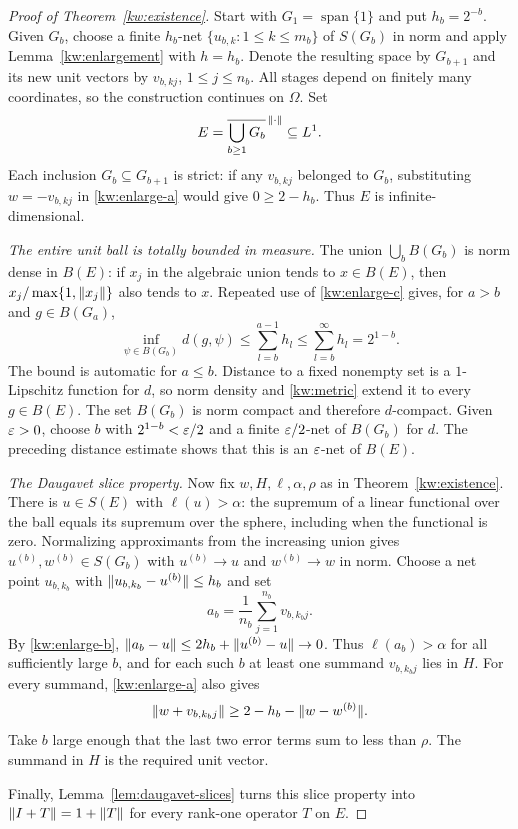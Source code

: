 \begin{proof}[Proof of Theorem~\ref{kw:existence}]
Start with $G_1=\operatorname{span}\{1\}$ and put $h_b=2^{-b}$.
Given $G_b$, choose a finite $h_b$-net
$\{u_{b,k}:1\le k\le m_b\}$ of $S(G_b)$ in norm and apply
Lemma~\ref{kw:enlargement} with $h=h_b$.  Denote the resulting space by
$G_{b+1}$ and its new unit vectors by $v_{b,kj}$, $1\le j\le n_b$.
All stages depend on finitely many coordinates, so the construction
continues on $\Omega$.  Set
\[
 E=\overline{\bigcup_{b\ge1}G_b}^{\,\lVert\cdot\rVert}\subseteq L^1.
\]
Each inclusion $G_b\subseteq G_{b+1}$ is strict: if any $v_{b,kj}$
belonged to $G_b$, substituting $w=-v_{b,kj}$ in
\eqref{kw:enlarge-a} would give $0\ge2-h_b$.
Thus $E$ is infinite-dimensional.

\emph{The entire unit ball is totally bounded in measure.}
The union
$\bigcup_bB(G_b)$ is norm dense in $B(E)$: if $x_j$ in the algebraic
union tends to $x\in B(E)$, then
$x_j/\max\{1,\lVert x_j\rVert\}$ also tends to $x$.
Repeated use of \eqref{kw:enlarge-c} gives, for $a>b$ and $g\in B(G_a)$,
\[
 \inf_{\psi\in B(G_b)}d(g,\psi)
 \le\sum_{l=b}^{a-1}h_l
 \le\sum_{l=b}^\infty h_l=2^{1-b}.
\]
The bound is automatic for $a\le b$.  Distance to a fixed nonempty
set is a $1$-Lipschitz function for $d$, so norm density and
\eqref{kw:metric} extend it to every $g\in B(E)$.
The set $B(G_b)$ is norm compact and therefore $d$-compact.
Given $\varepsilon>0$, choose $b$ with $2^{1-b}<\varepsilon/2$ and a finite
$\varepsilon/2$-net of $B(G_b)$ for $d$.  The preceding distance estimate
shows that this is an $\varepsilon$-net of $B(E)$.

\emph{The Daugavet slice property.}
Now fix $w,H,\ell,\alpha,\rho$ as in Theorem~\ref{kw:existence}.
There is $u\in S(E)$ with $\ell(u)>\alpha$: the supremum of a linear
functional over the ball equals its supremum over the sphere, including
when the functional is zero.  Normalizing approximants from the
increasing union gives $u^{(b)},w^{(b)}\in S(G_b)$ with
$u^{(b)}\to u$ and $w^{(b)}\to w$ in norm.
Choose a net point $u_{b,k_b}$ with
$\lVert u_{b,k_b}-u^{(b)}\rVert\le h_b$ and set
\[
 a_b=\frac1{n_b}\sum_{j=1}^{n_b}v_{b,k_bj}.
\]
By \eqref{kw:enlarge-b},
$\lVert a_b-u\rVert\le2h_b+\lVert u^{(b)}-u\rVert\to0$.
Thus $\ell(a_b)>\alpha$ for all sufficiently large $b$, and for each
such $b$ at least one summand $v_{b,k_bj}$ lies in $H$.
For every summand, \eqref{kw:enlarge-a} also gives
\[
 \lVert w+v_{b,k_bj}\rVert
 \ge2-h_b-\lVert w-w^{(b)}\rVert.
\]
Take $b$ large enough that the last two error terms sum to less than
$\rho$.  The summand in $H$ is the required unit vector.

Finally, Lemma~\ref{lem:daugavet-slices} turns this slice property into
$\lVert I+T\rVert=1+\lVert T\rVert$ for every rank-one operator $T$ on $E$.
\end{proof}
